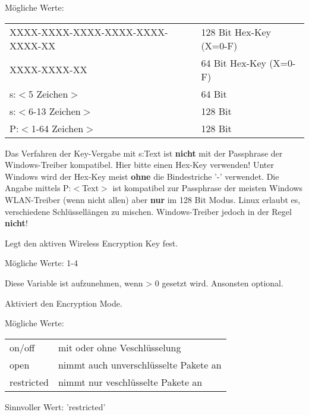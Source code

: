\begin{description}
        Mögliche Werte:

        \begin{tabular}[h]{ll}
        XXXX-XXXX-XXXX-XXXX-XXXX-XXXX-XX &       128 Bit Hex-Key (X=0-F) \\
        XXXX-XXXX-XX                     &        64 Bit Hex-Key (X=0-F) \\
        s:$<$5 Zeichen$>$                &        64 Bit\\
        s:$<$6-13 Zeichen$>$             &       128 Bit\\
        P:$<$1-64 Zeichen$>$             &       128 Bit\\
        \end{tabular}

        Das Verfahren der Key-Vergabe mit s:Text ist \textbf{nicht} mit der Passphrase
        der Windows-Treiber kompatibel. Hier bitte einen Hex-Key verwenden!
        Unter Windows wird der Hex-Key meist \textbf{ohne} die Bindestriche '-' verwendet.
        Die Angabe mittels P:$<$Text$>$ ist kompatibel zur Passphrase der meisten
        Windows WLAN-Treiber (wenn nicht allen) aber \textbf{nur} im 128 Bit Modus.
        Linux erlaubt es, verschiedene Schlüssellängen zu mischen. Windows-Treiber
        jedoch in der Regel \textbf{nicht}!


        Legt den aktiven Wireless Encryption Key fest.

        Mögliche Werte: 1-4
        
        Diese Variable ist aufzunehmen, wenn  > 0 gesetzt wird. Ansonsten optional.


        Aktiviert den Encryption Mode.

        Mögliche Werte:

        \begin{tabular}[h]{ll}
          on/off &         mit oder ohne Veschlüsselung \\
          open   &         nimmt auch unverschlüsselte Pakete an \\
          restricted &     nimmt nur veschlüsselte Pakete an \\
        \end{tabular}

        Sinnvoller Wert: 'restricted'
        

\end{description}
